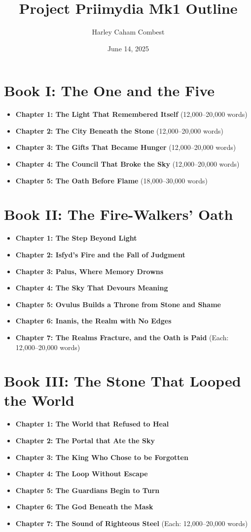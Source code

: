 \documentclass[9pt]{article}
\title{Project Priimydia Mk1 Outline}
\author{Harley Caham Combest}
\date{June 14, 2025}
\begin{document}
\maketitle

\section*{Book I: The One and the Five}
\begin{itemize}
  \item \textbf{Chapter 1: The Light That Remembered Itself} \hfill (12,000–20,000 words)
  \item \textbf{Chapter 2: The City Beneath the Stone} \hfill (12,000–20,000 words)
  \item \textbf{Chapter 3: The Gifts That Became Hunger} \hfill (12,000–20,000 words)
  \item \textbf{Chapter 4: The Council That Broke the Sky} \hfill (12,000–20,000 words)
  \item \textbf{Chapter 5: The Oath Before Flame} \hfill (18,000–30,000 words)
\end{itemize}

\section*{Book II: The Fire-Walkers’ Oath}
\begin{itemize}
  \item \textbf{Chapter 1: The Step Beyond Light}
  \item \textbf{Chapter 2: Isfyd’s Fire and the Fall of Judgment}
  \item \textbf{Chapter 3: Palus, Where Memory Drowns}
  \item \textbf{Chapter 4: The Sky That Devours Meaning}
  \item \textbf{Chapter 5: Ovulus Builds a Throne from Stone and Shame}
  \item \textbf{Chapter 6: Inanis, the Realm with No Edges}
  \item \textbf{Chapter 7: The Realms Fracture, and the Oath is Paid}
  \hfill (Each: 12,000–20,000 words)
\end{itemize}

\section*{Book III: The Stone That Looped the World}
\begin{itemize}
  \item \textbf{Chapter 1: The World that Refused to Heal}
  \item \textbf{Chapter 2: The Portal that Ate the Sky}
  \item \textbf{Chapter 3: The King Who Chose to be Forgotten}
  \item \textbf{Chapter 4: The Loop Without Escape}
  \item \textbf{Chapter 5: The Guardians Begin to Turn}
  \item \textbf{Chapter 6: The God Beneath the Mask}
  \item \textbf{Chapter 7: The Sound of Righteous Steel}
  \hfill (Each: 12,000–20,000 words)
\end{itemize}
\end{document}
